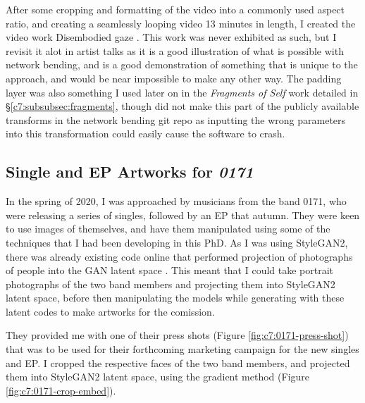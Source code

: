 After some cropping and formatting of the video into a commonly used aspect ratio, and creating a seamlessly looping video 13 minutes in length, I created the video work Disembodied gaze \citep{broad2020disembodied}. 
This work was never exhibited as such, but I revisit it alot in artist talks as it is a good illustration of what is possible with network bending, and is a good demonstration of something that is unique to the approach, and would be near impossible to make any other way. 
The padding layer was also something I used later on in the \textit{Fragments of Self} work detailed in \S \ref{c7:subsubsec:fragments}, though did not make this part of the publicly available transforms in the network bending git repo as inputting the wrong parameters into this transformation could easily cause the software to crash.

\subsection{Single and EP Artworks for \textit{0171}}
\label{c7:subsubsec:0171}

In the spring of 2020, I was approached by musicians from the band 0171, who were releasing a series of singles, followed by an EP that autumn. 
They were keen to use images of themselves, and have them manipulated using some of the techniques that I had been developing in this PhD.
As I was using StyleGAN2, there was already existing code online that performed projection of photographs of people into the GAN latent space \citep{abdal2019image2stylegan}.
This meant that I could take portrait photographs of the two band members and projecting them into StyleGAN2 latent space, before then manipulating the models while generating with these latent codes to make artworks for the comission. 

They provided me with one of their press shots (Figure \ref{fig:c7:0171-press-shot})  that was to be used for their forthcoming marketing campaign for the new singles and EP. 
I cropped the respective faces of the two band members, and projected them into StyleGAN2 latent space, using the gradient method \citep{abdal2019image2stylegan} (Figure \ref{fig:c7:0171-crop-embed}).

